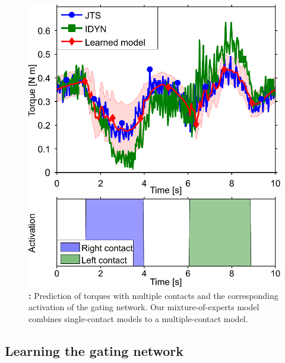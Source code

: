 \begin{figure}[t]
\begin{minipage}{.52\linewidth}
			\includegraphics[width=.99\linewidth]{fig/exp3_both}
			\caption{\textbf{:} Prediction of torques with multiple contacts and the corresponding activation of the gating network.
			Our mixture-of-experts model combines single-contact models to a multiple-contact model.
			}
			\label{fig:exp3:gating}
		\end{minipage}	
        \figspace
	\end{figure}



\subsection{Learning the gating network}
\label{sec:results:exp5}

